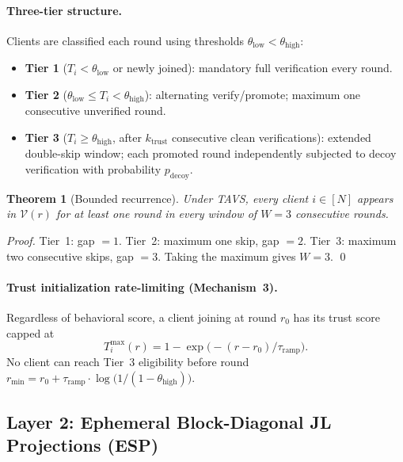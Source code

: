 \documentclass{article}
\newtheorem{theorem}{Theorem}
\newcommand{\calV}{\mathcal{V}}      %
\newcommand{\TAVS}{\textsc{TAVS}}
\newcommand{\ESP}{\textsc{ESP}}
\begin{document}
\paragraph{Three-tier structure.}
Clients are classified each round using thresholds $\theta_{\mathrm{low}} <
\theta_{\mathrm{high}}$:
\begin{itemize}
  \item \textbf{Tier 1} ($T_i < \theta_{\mathrm{low}}$ or newly joined):
    mandatory full verification every round.
  \item \textbf{Tier 2} ($\theta_{\mathrm{low}} \le T_i < \theta_{\mathrm{high}}$):
    alternating verify/promote; maximum one consecutive unverified round.
  \item \textbf{Tier 3} ($T_i \ge \theta_{\mathrm{high}}$, after $k_{\mathrm{trust}}$
    consecutive clean verifications): extended double-skip window; each
    promoted round independently subjected to decoy verification with
    probability $p_{\mathrm{decoy}}$.
\end{itemize}

\begin{theorem}[Bounded recurrence]
\label{thm:recurrence}
Under \TAVS{}, every client $i \in [N]$ appears in $\calV(r)$ for at least one
round in every window of $W = 3$ consecutive rounds.
\end{theorem}
\begin{proof}
  Tier~1: gap $= 1$. Tier~2: maximum one skip, gap $= 2$.
  Tier~3: maximum two consecutive skips, gap $= 3$. Taking the maximum gives
  $W = 3$. \qed
\end{proof}

\paragraph{Trust initialization rate-limiting (Mechanism~3).}
Regardless of behavioral score, a client joining at round $r_0$ has its trust
score capped at
\[
  T_i^{\max}(r) = 1 - \exp\!\bigl({-}(r - r_0)/\tau_{\mathrm{ramp}}\bigr).
\]
No client can reach Tier~3 eligibility before round
$r_{\min} = r_0 + \tau_{\mathrm{ramp}} \cdot \log\!\bigl(1/(1-\theta_{\mathrm{high}})\bigr)$.

\subsection{Layer 2: Ephemeral Block-Diagonal JL Projections (\ESP{})}
\label{sec:layer2}
\end{document}
